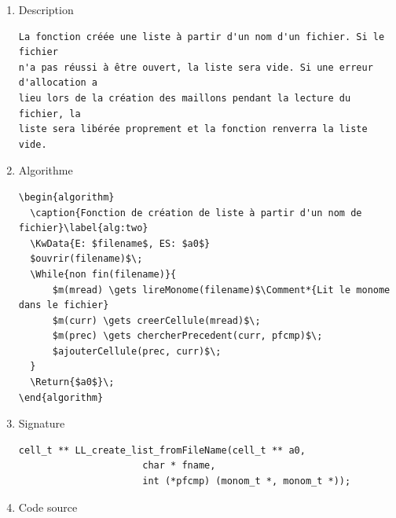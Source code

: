 \documentclass[11pt]{article}
\begin{document}
\begin{enumerate}
\item Description
\label{sec:org3efa346}

\begin{verbatim}
La fonction créée une liste à partir d'un nom d'un fichier. Si le fichier
n'a pas réussi à être ouvert, la liste sera vide. Si une erreur d'allocation a
lieu lors de la création des maillons pendant la lecture du fichier, la
liste sera libérée proprement et la fonction renverra la liste vide.
\end{verbatim}

\item Algorithme
\label{sec:orgedde225}

\begin{verbatim}
\begin{algorithm}
  \caption{Fonction de création de liste à partir d'un nom de fichier}\label{alg:two}
  \KwData{E: $filename$, ES: $a0$}
  $ouvrir(filename)$\;
  \While{non fin(filename)}{
      $m(mread) \gets lireMonome(filename)$\Comment*{Lit le monome dans le fichier}
      $m(curr) \gets creerCellule(mread)$\;
      $m(prec) \gets chercherPrecedent(curr, pfcmp)$\;
      $ajouterCellule(prec, curr)$\;
  }
  \Return{$a0$}\;
\end{algorithm}
\end{verbatim}

\item Signature
\label{sec:org70557b8}

\begin{verbatim}
cell_t ** LL_create_list_fromFileName(cell_t ** a0,
				      char * fname,
				      int (*pfcmp) (monom_t *, monom_t *));
\end{verbatim}

\item Code source
\label{sec:orgfd7e1df}


\end{enumerate}
\end{document}
